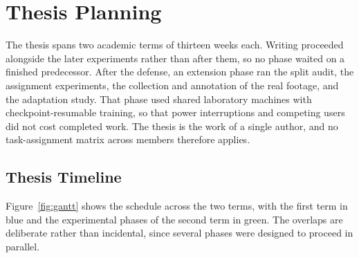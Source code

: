\documentclass[12pt,a4paper,oneside]{report}
\begin{document}
\section{Thesis Planning}
The thesis spans two academic terms of thirteen weeks each. Writing proceeded
alongside the later experiments rather than after them, so no phase waited on a
finished predecessor. After the defense, an extension phase ran the split audit,
the assignment experiments, the collection and annotation of the real footage,
and the adaptation study. That phase used shared laboratory machines with
checkpoint-resumable training, so that power interruptions and competing users
did not cost completed work. The thesis is the work of a single author, and no
task-assignment matrix across members therefore applies.

\subsection{Thesis Timeline}
Figure~\ref{fig:gantt} shows the schedule across the two terms, with the first
term in blue and the experimental phases of the second term in green. The
overlaps are deliberate rather than incidental, since several phases were
designed to proceed in parallel.
\end{document}
